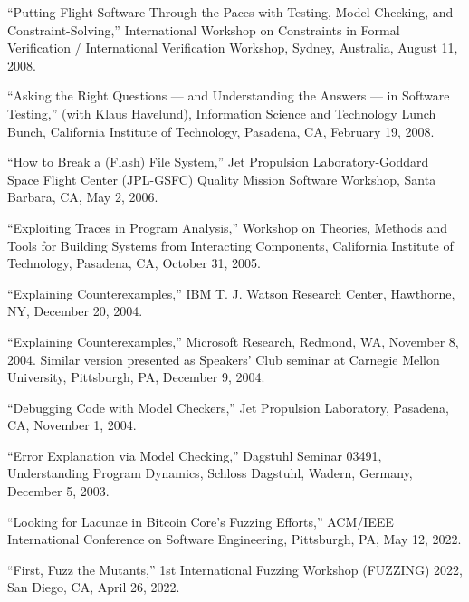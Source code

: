 \documentclass[ComputerScience]{vita}
\begin{document}
\begin{vita}
\begin{Invited Talks and Panels}
\item ``Putting Flight Software Through the Paces with Testing, Model Checking, and Constraint-Solving,'' International Workshop on Constraints in Formal Verification / International Verification Workshop, Sydney, Australia, August 11, 2008.

\item ``Asking the Right Questions --- and Understanding the Answers --- in Software Testing,'' (with Klaus Havelund), Information Science and Technology Lunch Bunch, California Institute of Technology, Pasadena, CA, February 19, 2008.

\item ``How to Break a (Flash) File System,'' Jet Propulsion Laboratory-Goddard Space Flight Center (JPL-GSFC) Quality Mission Software Workshop, Santa Barbara, CA, May 2, 2006.

 \item ``Exploiting Traces in Program Analysis,'' Workshop on Theories, Methods and Tools for Building Systems from Interacting Components, California Institute of Technology, Pasadena, CA, October 31, 2005.


  \item ``Explaining Counterexamples,'' IBM T. J. Watson Research Center, Hawthorne, NY, December 20, 2004.

  \item ``Explaining Counterexamples,'' Microsoft Research, Redmond, WA, November 8, 2004.  Similar version presented as Speakers' Club seminar at Carnegie Mellon University, Pittsburgh, PA, December 9, 2004.

  \item ``Debugging Code with Model Checkers,'' Jet Propulsion Laboratory, Pasadena, CA, November 1, 2004.

\item ``Error Explanation via Model Checking,''  Dagstuhl Seminar 03491, Understanding Program Dynamics, Schloss Dagstuhl, Wadern, Germany, December 5, 2003.



\end{Invited Talks and Panels}

\begin{Selected Presentations}
\item ``Looking for Lacunae in Bitcoin Core’s Fuzzing Efforts,'' ACM/IEEE International Conference on Software Engineering, Pittsburgh, PA, May 12, 2022.

\item ``First, Fuzz the Mutants,'' 1st International Fuzzing Workshop (FUZZING) 2022, San Diego, CA, April 26, 2022.


\end{Selected Presentations}
\end{vita}
\end{document}
